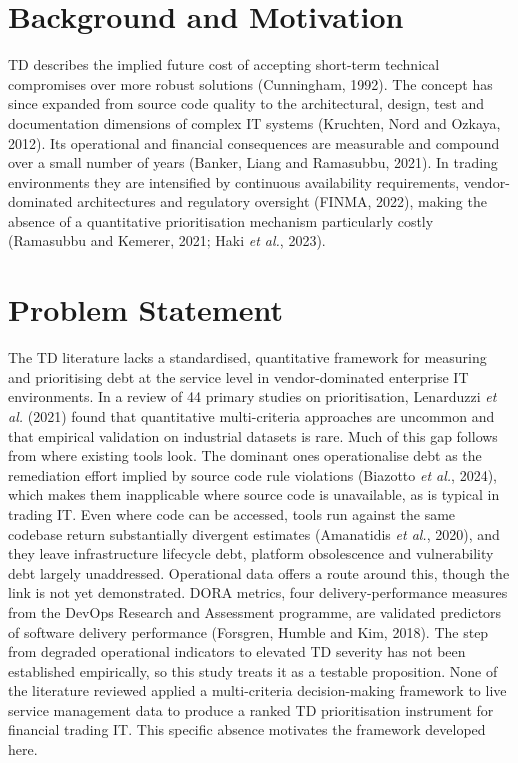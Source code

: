 \documentclass[
  12pt,
  letterpaper,
  12pt,
  oneside,
  english,
  onehalfspacing,
  headsepline]{MastersDoctoralThesis}
\begin{document}
\section{Background and Motivation}\label{background-and-motivation}

TD describes the implied future cost of accepting short-term technical
compromises over more robust solutions (Cunningham, 1992). The concept
has since expanded from source code quality to the architectural,
design, test and documentation dimensions of complex IT systems
(Kruchten, Nord and Ozkaya, 2012). Its operational and financial
consequences are measurable and compound over a small number of years
(Banker, Liang and Ramasubbu, 2021). In trading environments they are
intensified by continuous availability requirements, vendor-dominated
architectures and regulatory oversight (FINMA, 2022), making the absence
of a quantitative prioritisation mechanism particularly costly
(Ramasubbu and Kemerer, 2021; Haki \emph{et al.}, 2023).

\section{Problem Statement}\label{problem-statement}

The TD literature lacks a standardised, quantitative framework for
measuring and prioritising debt at the service level in vendor-dominated
enterprise IT environments. In a review of 44 primary studies on
prioritisation, Lenarduzzi \emph{et al.} (2021) found that quantitative
multi-criteria approaches are uncommon and that empirical validation on
industrial datasets is rare. Much of this gap follows from where
existing tools look. The dominant ones operationalise debt as the
remediation effort implied by source code rule violations (Biazotto
\emph{et al.}, 2024), which makes them inapplicable where source code is
unavailable, as is typical in trading IT. Even where code can be
accessed, tools run against the same codebase return substantially
divergent estimates (Amanatidis \emph{et al.}, 2020), and they leave
infrastructure lifecycle debt, platform obsolescence and vulnerability
debt largely unaddressed. Operational data offers a route around this,
though the link is not yet demonstrated. DORA metrics, four
delivery-performance measures from the DevOps Research and Assessment
programme, are validated predictors of software delivery performance
(Forsgren, Humble and Kim, 2018). The step from degraded operational
indicators to elevated TD severity has not been established empirically,
so this study treats it as a testable proposition. None of the
literature reviewed applied a multi-criteria decision-making framework
to live service management data to produce a ranked TD prioritisation
instrument for financial trading IT. This specific absence motivates the
framework developed here.
\end{document}
